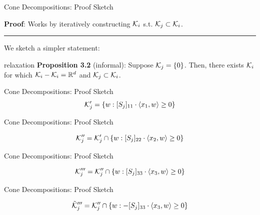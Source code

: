 \documentclass[usenames,dvipsnames,mathserif,notheorems]{beamer}
\newcommand{\horizontalrule}{
	{
			\vspace{-0.5em}
			\center \rule{\textwidth}{0.1em}
			\vspace{-0.2em}
		}
}
\begin{document}
\begin{frame}{Cone Decompositions: Proof Sketch}

	\textbf{Proof}: Works by iteratively constructing \( \mathcal{K}_i \) s.t. \( \mathcal{K}_j \subset \mathcal{K}_i \).

	\pause
	\horizontalrule

	We sketch a simpler statement:

	\vspace{1em}

	\begin{beamercolorbox}[wd=\textwidth,sep=1em]{relaxation}
		\textbf{Proposition 3.2} (informal): Suppose \( \mathcal{K}_j = \left\{0\right\} \).
		Then, there exists \( \mathcal{K}_i \) for which \( \mathcal{K}_i - \mathcal{K}_i = \mathbb{R}^d \)
		and \( \mathcal{K}_j \subset \mathcal{K}_i \).
	\end{beamercolorbox}


\end{frame}


\begin{frame}{Cone Decompositions: Proof Sketch}
	\[
		\mathcal{K}_j' = \left\{w : [S_j]_{11} \cdot \left\langle x_1, w\right\rangle \geq 0\right\}
	\]
	\begin{figure}[]
		\centering
		
	\end{figure}
\end{frame}

\begin{frame}{Cone Decompositions: Proof Sketch}

	\[
		\mathcal{K}_j'' = \mathcal{K}_j' \cap \left\{w : [S_j]_{22} \cdot \left\langle x_2, w\right\rangle \geq 0\right\}
	\]

	\begin{figure}[]
		\centering
		
	\end{figure}
\end{frame}


\begin{frame}{Cone Decompositions: Proof Sketch}

	\[
		\mathcal{K}_j''' = \mathcal{K}_j'' \cap \left\{w : [S_j]_{33} \cdot \left\langle x_3, w\right\rangle \geq 0\right\}
	\]

	\begin{figure}[]
		\centering
		
	\end{figure}
\end{frame}


\begin{frame}{Cone Decompositions: Proof Sketch}

	\[
		\tilde {\mathcal{K}}_j''' = \mathcal{K}_j'' \cap \left\{w : -[S_j]_{33} \cdot \left\langle x_3, w\right\rangle \geq 0\right\}
	\]

	\begin{figure}[]
		\centering
		
	\end{figure}
\end{frame}
\end{document}
